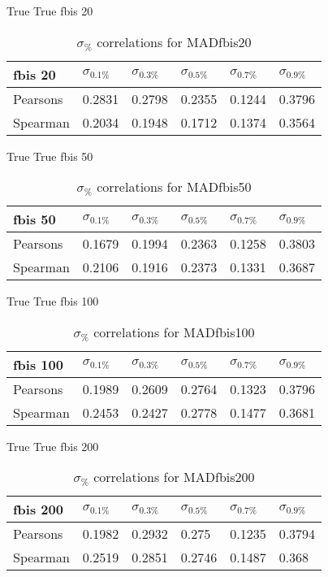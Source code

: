 \documentclass{sig-alternate}
\begin{document}
True True fbis 20
\begin{table}[h!]
\centering
\caption{$\sigma_{\%}$ correlations for MADfbis20}
\begin{tabular}{|l|l|l|l|l|l|}
\hline
fbis 20 & $\sigma_{0.1\%}$ & $\sigma_{0.3\%}$ & $\sigma_{0.5\%}$ & $\sigma_{0.7\%}$ & $\sigma_{0.9\%}$ \\ \hline
Pearsons  & 0.2831 & 0.2798 & 0.2355 & 0.1244 & 0.3796 \\ \hline
Spearman  & 0.2034 & 0.1948 & 0.1712 & 0.1374 & 0.3564 \\ \hline
\end{tabular}
\end{table}
True True fbis 50
\begin{table}[h!]
\centering
\caption{$\sigma_{\%}$ correlations for MADfbis50}
\begin{tabular}{|l|l|l|l|l|l|}
\hline
fbis 50 & $\sigma_{0.1\%}$ & $\sigma_{0.3\%}$ & $\sigma_{0.5\%}$ & $\sigma_{0.7\%}$ & $\sigma_{0.9\%}$ \\ \hline
Pearsons  & 0.1679 & 0.1994 & 0.2363 & 0.1258 & 0.3803 \\ \hline
Spearman  & 0.2106 & 0.1916 & 0.2373 & 0.1331 & 0.3687 \\ \hline
\end{tabular}
\end{table}
True True fbis 100
\begin{table}[h!]
\centering
\caption{$\sigma_{\%}$ correlations for MADfbis100}
\begin{tabular}{|l|l|l|l|l|l|}
\hline
fbis 100 & $\sigma_{0.1\%}$ & $\sigma_{0.3\%}$ & $\sigma_{0.5\%}$ & $\sigma_{0.7\%}$ & $\sigma_{0.9\%}$ \\ \hline
Pearsons  & 0.1989 & 0.2609 & 0.2764 & 0.1323 & 0.3796 \\ \hline
Spearman  & 0.2453 & 0.2427 & 0.2778 & 0.1477 & 0.3681 \\ \hline
\end{tabular}
\end{table}
True True fbis 200
\begin{table}[h!]
\centering
\caption{$\sigma_{\%}$ correlations for MADfbis200}
\begin{tabular}{|l|l|l|l|l|l|}
\hline
fbis 200 & $\sigma_{0.1\%}$ & $\sigma_{0.3\%}$ & $\sigma_{0.5\%}$ & $\sigma_{0.7\%}$ & $\sigma_{0.9\%}$ \\ \hline
Pearsons  & 0.1982 & 0.2932 & 0.275 & 0.1235 & 0.3794 \\ \hline
Spearman  & 0.2519 & 0.2851 & 0.2746 & 0.1487 & 0.368 \\ \hline
\end{tabular}
\end{table}
\end{document}
